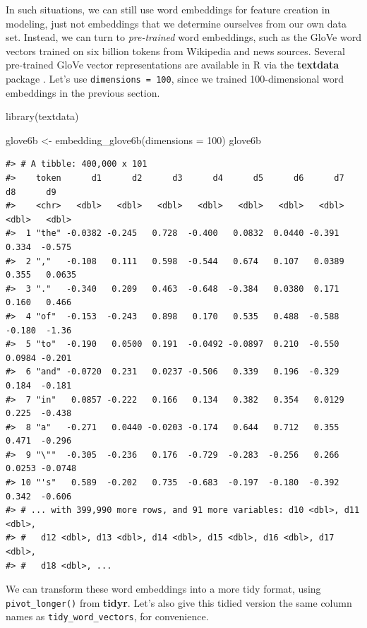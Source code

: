 \documentclass[
]{krantz}
\makeatletter
\newenvironment{Shaded}{\begin{snugshade}}{\end{snugshade}}
\newcommand{\AttributeTok}[1]{\textcolor[rgb]{0.77,0.63,0.00}{#1}}
\newcommand{\DecValTok}[1]{\textcolor[rgb]{0.00,0.00,0.81}{#1}}
\newcommand{\FunctionTok}[1]{\textcolor[rgb]{0.00,0.00,0.00}{#1}}
\newcommand{\NormalTok}[1]{#1}
\newcommand{\OtherTok}[1]{\textcolor[rgb]{0.56,0.35,0.01}{#1}}
\newenvironment{kframe}{%
\medskip{}
\setlength{\fboxsep}{.8em}
 \def\at@end@of@kframe{}%
 \ifinner\ifhmode%
  \def\at@end@of@kframe{\end{minipage}}%
  \begin{minipage}{\columnwidth}%
 \fi\fi%
 \def\FrameCommand##1{\hskip\@totalleftmargin \hskip-\fboxsep
 \colorbox{shadecolor}{##1}\hskip-\fboxsep
     \hskip-\linewidth \hskip-\@totalleftmargin \hskip\columnwidth}%
 \MakeFramed {\advance\hsize-\width
   \@totalleftmargin\z@ \linewidth\hsize
   \@setminipage}}%
 {\par\unskip\endMakeFramed%
 \at@end@of@kframe}
\renewenvironment{Shaded}{\begin{kframe}}{\end{kframe}}
\makeatother
\begin{document}
In such situations, we can still use word embeddings for feature creation in modeling, just not embeddings that we determine ourselves from our own data set. Instead, we can turn to \emph{pre-trained} word embeddings, such as the GloVe word vectors trained on six billion tokens from Wikipedia and news sources. Several pre-trained GloVe vector representations are available in R via the \textbf{textdata} package \citep{Hvitfeldt2020}. Let's use \texttt{dimensions\ =\ 100}, since we trained 100-dimensional word embeddings in the previous section.

\begin{Shaded}
\begin{Highlighting}[]
\FunctionTok{library}\NormalTok{(textdata)}

\NormalTok{glove6b }\OtherTok{\textless{}{-}} \FunctionTok{embedding\_glove6b}\NormalTok{(}\AttributeTok{dimensions =} \DecValTok{100}\NormalTok{)}
\NormalTok{glove6b}
\end{Highlighting}
\end{Shaded}

\begin{verbatim}
#> # A tibble: 400,000 x 101
#>    token      d1      d2      d3      d4      d5      d6      d7      d8      d9
#>    <chr>   <dbl>   <dbl>   <dbl>   <dbl>   <dbl>   <dbl>   <dbl>   <dbl>   <dbl>
#>  1 "the" -0.0382 -0.245   0.728  -0.400   0.0832  0.0440 -0.391   0.334  -0.575 
#>  2 ","   -0.108   0.111   0.598  -0.544   0.674   0.107   0.0389  0.355   0.0635
#>  3 "."   -0.340   0.209   0.463  -0.648  -0.384   0.0380  0.171   0.160   0.466 
#>  4 "of"  -0.153  -0.243   0.898   0.170   0.535   0.488  -0.588  -0.180  -1.36  
#>  5 "to"  -0.190   0.0500  0.191  -0.0492 -0.0897  0.210  -0.550   0.0984 -0.201 
#>  6 "and" -0.0720  0.231   0.0237 -0.506   0.339   0.196  -0.329   0.184  -0.181 
#>  7 "in"   0.0857 -0.222   0.166   0.134   0.382   0.354   0.0129  0.225  -0.438 
#>  8 "a"   -0.271   0.0440 -0.0203 -0.174   0.644   0.712   0.355   0.471  -0.296 
#>  9 "\""  -0.305  -0.236   0.176  -0.729  -0.283  -0.256   0.266   0.0253 -0.0748
#> 10 "'s"   0.589  -0.202   0.735  -0.683  -0.197  -0.180  -0.392   0.342  -0.606 
#> # ... with 399,990 more rows, and 91 more variables: d10 <dbl>, d11 <dbl>,
#> #   d12 <dbl>, d13 <dbl>, d14 <dbl>, d15 <dbl>, d16 <dbl>, d17 <dbl>,
#> #   d18 <dbl>, ...
\end{verbatim}

We can transform these word embeddings into a more tidy format, using \texttt{pivot\_longer()} from \textbf{tidyr}. Let's also give this tidied version the same column names as \texttt{tidy\_word\_vectors}, for convenience.
\end{document}
